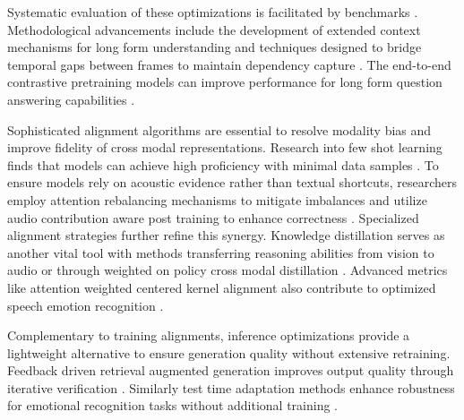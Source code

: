 \documentclass{llmxive}
\begin{document}
Systematic evaluation of these optimizations is facilitated by benchmarks \cite{luo2026chronosaudio}. Methodological advancements include the development of extended context mechanisms for long form understanding \cite{chaichana2026extending} and techniques designed to bridge temporal gaps between frames to maintain dependency capture \cite{wang2026listening}. The end-to-end contrastive pretraining models can improve performance for long form question answering capabilities \cite{hu2026end}.

Sophisticated alignment algorithms are essential to resolve modality bias and improve fidelity of cross modal representations. Research into few shot learning finds that models can achieve high proficiency with minimal data samples \cite{zhang2025mimo}. To ensure models rely on acoustic evidence rather than textual shortcuts, researchers employ attention rebalancing mechanisms to mitigate imbalances \cite{wang2025pay} and utilize audio contribution aware post training to enhance correctness \cite{he2025measuring}. Specialized alignment strategies \cite{grinberg2026alarm} further refine this synergy. Knowledge distillation serves as another vital tool with methods transferring reasoning abilities from vision to audio \cite{wang2025sightsound} or through weighted on policy cross modal distillation \cite{hu2026cord}. Advanced metrics like attention weighted centered kernel alignment also contribute to optimized speech emotion recognition \cite{yang2026attention}.

Complementary to training alignments, inference optimizations provide a lightweight alternative to ensure generation quality without extensive retraining. Feedback driven retrieval augmented generation improves output quality through iterative verification \cite{zhao2025feedback}. Similarly test time adaptation methods enhance robustness for emotional recognition tasks without additional training \cite{shi2025emo}.
\end{document}
